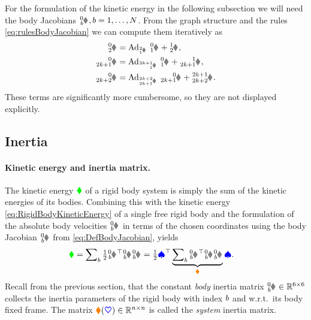 \begin{Example}
For the formulation of the kinetic energy in the following subsection we will need the body Jacobians $\bodyJac{0}{\BidxII}, \BidxII=1,\ldots,\numRigidBodies$.
From the graph structure and the rules \eqref{eq:rulesBodyJacobian} we can compute them iteratively as
\begin{subequations}
\begin{align}
 \bodyJac{0}{2} &= \Ad{\bodyHomoCoord{2}{1}} \ \bodyJac{0}{1} + \bodyJac{1}{2},
\\
 \bodyJac{0}{2k+1} &= \Ad{\bodyHomoCoord{2k+1}{1}} \ \bodyJac{0}{1} + \bodyJac{1}{2k+1},
\\
 \bodyJac{0}{2k+2} &= \Ad{\bodyHomoCoord{2k+2}{2k+1}} \ \bodyJac{0}{2k+1} + \bodyJac{2k+1}{2k+2}.
\end{align}
\end{subequations}
These terms are significantly more cumbersome, so they are not displayed explicitly.
\end{Example}



\subsection{Inertia}\label{sec:RBSInertia}
\paragraph{Kinetic energy and inertia matrix.}
The kinetic energy $\textcolor{green}{\blacklozenge}$ of a rigid body system is simply the sum of the kinetic energies of its bodies.
Combining this with the kinetic energy \eqref{eq:RigidBodyKineticEnergy} of a single free rigid body and the formulation of the absolute body velocities $\bodyVel{0}{\BidxII}$ in terms of the chosen coordinates using the body Jacobian $\bodyJac{0}{\BidxII}$ from \eqref{eq:DefBodyJacobian}, yields
\begin{align}\label{eq:RBSKineticEnergy}
 \kineticEnergy
 &= \sumBodies \tfrac{1}{2} \bodyVel{0}{\BidxII}^\top \bodyInertiaMat{0}{\BidxII}\bodyVel{0}{\BidxII}
 = \tfrac{1}{2} \sysVel^\top \underbrace{\sumBodies \bodyJac{0}{\BidxII}^\top \bodyInertiaMat{0}{\BidxII} \bodyJac{0}{\BidxII}}_{\sysInertiaMat} \sysVel.
\end{align}
Recall from the previous section, that the constant \textit{body} inertia matrix $\bodyInertiaMat{0}{\BidxII} \in \RealNum^{6\times6}$ collects the inertia parameters of the rigid body with index $b$ and w.r.t.\ its body fixed frame. 
The matrix $\boldsymbol{\textcolor{orange}{\blacklozenge}}(\boldsymbol{\textcolor{blue}{\heartsuit}}) \in \mathbb{R}^{n\times n}$ is called the \textit{system} inertia matrix.

